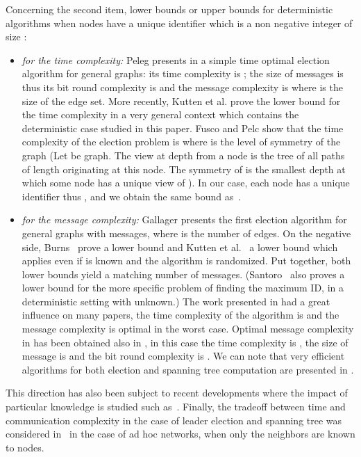\documentclass[11pt,envcountsame,letterpaper]{llncs}
\begin{document}
Concerning the second item, lower bounds or upper bounds for deterministic algorithms
when nodes have a unique identifier which is a non negative
integer of size :
\begin{itemize}
\item {\it for the time complexity:}
Peleg presents in \cite{Peleg90} a simple time optimal election algorithm
for general graphs: its time complexity is ;
 the size of
messages is  thus its bit round complexity is
 and the message complexity is 
where  is the size of the edge set.
More recently, Kutten et al. \cite{KPPRT15}
prove the lower bound  for the time
complexity in a very general context which contains the deterministic case
studied in this paper. Fusco and Pelc \cite{FP15} show that the 
time complexity
of the election problem is
 where  is the level of symmetry
of the graph  (Let  be graph. 
The view at depth  from a node is the tree of all paths
of length  originating at this node. The symmetry of  is the
smallest depth at which some node has a unique view of ).
In our case, each node has  a unique identifier thus , and we obtain
the same bound as~\cite{KPPRT15}.
\item {\it for the message complexity:}
Gallager \cite{Gallager} presents the first election 
algorithm for general graphs with  messages, 
where  is the number of edges.
On the negative side, Burns~\cite{burns1980} prove a  lower bound and Kutten et al.~\cite{KPPRT15} a  lower bound which applies even if  is known and the algorithm is randomized. Put together, both lower bounds yield a matching  number of messages. (Santoro~\cite{Santoro84} also proves a  lower bound for the more specific problem of finding the maximum ID, in a deterministic setting with  unknown.)
The work presented in \cite{GHS83} had a
great influence on many papers, the time complexity of the algorithm 
is  and the message complexity is optimal  in the worst case.
Optimal message complexity in  has been obtained 
also in \cite{Awer87}, in this case the time complexity is , the size 
of message is  and the
bit round complexity is .
We can note that very efficient algorithms for both election
and spanning tree computation are presented in \cite{KKM90}.
\end{itemize}
This direction has also been subject to recent developments where the impact of particular knowledge is studied such as~\cite{DP16,GMP17,MP16}. Finally, the tradeoff between time and communication complexity in the case of leader election and spanning tree was considered in~\cite{KK13} in the case of ad hoc networks, when only the neighbors are known to nodes.
\end{document}
